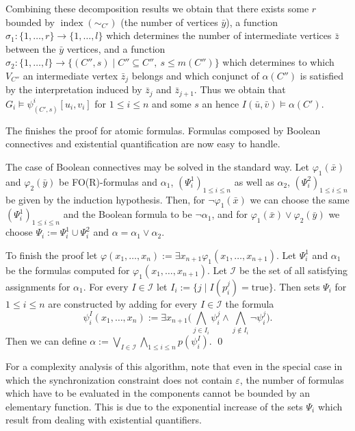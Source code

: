 \documentclass{LMCS}
\renewcommand{\phi}{\varphi}
\renewcommand{\epsilon}{\varepsilon}
\DeclareMathOperator{\ind}{index}
\begin{document}
Combining these decomposition results we obtain that there exists some $r$ bounded by $\ind(\sim_{C'})$ (the 
number of vertices $\bar y$), a function $\sigma_1:\{1,\ldots,r\} \rightarrow \{1,\ldots, l\}$ 
which determines the number of intermediate vertices $\bar z$ between the $\bar y$ vertices, and a function 
$\sigma_2:\{1,\ldots,l\} \rightarrow \{(C'',s) \mid C'' \subseteq C'', \ s \le m(C'')\}$ which determines
to which $V_{C''}$ an intermediate vertex $\bar z_j$ belongs and which conjunct of $\alpha(C'')$ is satisfied
by the interpretation induced by $\bar z_j$ and $\bar z_{j+1}$.  Thus we obtain that 
$G_i \models \psi^i_{(C',s)}[u_i,v_i]$ for $1 \le i \le n$ and some $s$ an hence
$I(\bar u, \bar v) \models \alpha(C')$.

The finishes the proof for atomic formulas. Formulas composed by Boolean connectives and
existential quantification are now easy to handle.

The case of Boolean connectives may be solved in the standard way.
Let $\phi_1(\bar x)$ and $\phi_2(\bar y)$ be FO(R)-formulas and 
$\alpha_1$, $(\Psi_i^1)_{1 \le i \le n}$ as well as $\alpha_2$, $(\Psi_i^2)_{1 \le i \le n}$
be given by the induction hypothesis.  Then, for $\neg \phi_1(\bar x)$ we can choose the
same $(\Psi_i^1)_{1 \le i \le n}$ and the Boolean formula to be $\neg \alpha_1$, and for
$\phi_1(\bar x) \vee \phi_2(\bar y)$ we choose $\Psi_i:=\Psi_i^1 \cup \Psi_i^2$ and 
$\alpha = \alpha_1 \vee \alpha_2$.

To finish the proof let $\phi(x_1,\ldots,x_n):= \exists x_{n+1} \phi_1(x_1,\ldots,x_{n+1})$. Let 
$\Psi_i^1$ and $\alpha_1$ be the formulas computed for $\phi_1(x_1,\ldots,x_{n+1})$. Let 
$\mathcal I$ be the set of all satisfying assignments for $\alpha_1$. For every 
$I \in \mathcal I$ let $I_i:=\{j \mid I(p_i^j)=\text{true}\}$. Then sets $\Psi_i$ for $1 \le i \le n$
are constructed by adding for every $I \in \mathcal I$ the formula 
\[\psi_i^I(x_1,\ldots,x_n):= \exists x_{n+1} \Big( \bigwedge_{j \in I_i} \psi_i^j \wedge
  \bigwedge_{j \notin I_i} \neg \psi_i^j\Big).\]
Then we can define $\alpha:=\bigvee_{I \in \mathcal I} \bigwedge_{1 \le i \le n} p(\psi_i^I)$. 
\qed













For a complexity analysis of this algorithm, note that even in the special case in which the synchronization 
constraint does not contain $\epsilon$, the number of formulas which have to be evaluated in the components 
cannot be bounded by an elementary function. This is due to the exponential increase of the sets $\Psi_i$ which result
from dealing with existential quantifiers. 
\end{document}
